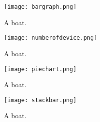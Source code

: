 \documentclass[12pt]{article}
\begin{document}
\tableofcontents

\begin{figure}
    \texttt{[image: bargraph.png]}
    \caption{A boat.}
    \label{fig:boat1}
  \end{figure}

  \begin{figure}
    \texttt{[image: numberofdevice.png]}
    \caption{A boat.}
    \label{fig:boat1}
  \end{figure}

  \begin{figure}
    \texttt{[image: piechart.png]}
    \caption{A boat.}
    \label{fig:boat1}
  \end{figure}

  \begin{figure}
    \texttt{[image: stackbar.png]}
    \caption{A boat.}
    \label{fig:boat1}
  \end{figure}
\end{document}
